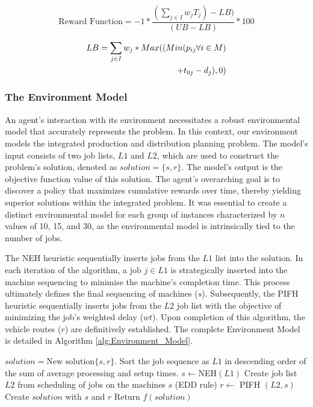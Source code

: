 \documentclass{article}
\begin{document}
\begin{equation}
\label{eq:Reward}
    \text{Reward Function} = -1* \frac{(\sum\limits_{j \in I} w_{j}T_{j}) - LB)}{(UB - LB)}*100
\end{equation}

\begin{align}
\label{eq:LB}
   LB = \sum\limits_{j \in I} w_{j} * Max((Min(p_{ij} \forall i \in M) \notag\\
   \quad + t_{0j} - d_j), 0)
\end{align}



\subsubsection{The Environment Model} %
An agent's interaction with its environment necessitates a robust environmental model that accurately represents the problem. In this context, our environment models the integrated production and distribution planning problem. The model's input consists of two job lists, $L1$ and $L2$, which are used to construct the problem's solution, denoted as $solution = \{s, r\}$. The model's output is the objective function value of this solution. The agent's overarching goal is to discover a policy that maximizes cumulative rewards over time, thereby yielding superior solutions within the integrated problem. It was essential to create a distinct environmental model for each group of instances characterized by $n$ values of 10, 15, and 30, as the environmental model is intrinsically tied to the number of jobs.

The NEH heuristic sequentially inserts jobs from the $L1$ list into the solution. In each iteration of the algorithm, a job $j \in L1$ is strategically inserted into the machine sequencing to minimise the machine's completion time. This process ultimately defines the final sequencing of machines ($s$). Subsequently, the PIFH heuristic sequentially inserts jobs from the $L2$ job list with the objective of minimizing the job's weighted delay ($wt$). Upon completion of this algorithm, the vehicle routes ($r$) are definitively established. The complete Environment Model is detailed in Algorithm \ref{alg:Environment_Model}.


\begin{algorithm}[H]
\caption{Environment Model\label{alg:Environment_Model}}
\begin{algorithmic}[1]
     \State $solution = \text{New solution} \{s, r\}$.
     \State Sort the job sequence as $L1$ in descending order of the sum of average processing and setup times.
     \State $s \leftarrow $NEH$(L1)$
     \State Create job list $L2$ from scheduling of jobs on the machines $s$ (EDD rule)
     \State $r \leftarrow$ PIFH $(L2, s)$
    \State Create $solution$ with $s$ and $r$
    \State Return  $f(solution)$
\end{algorithmic}
\end{algorithm}
\end{document}
